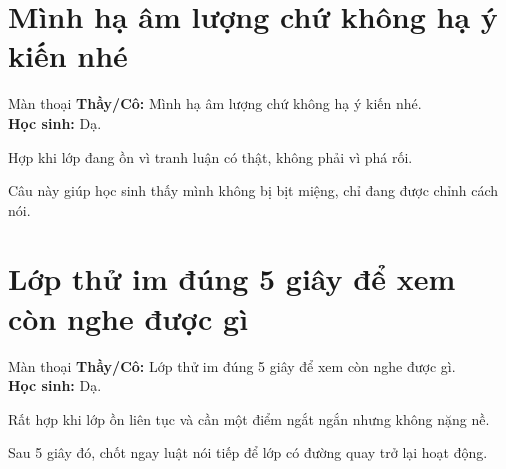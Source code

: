 \section{Mình hạ âm lượng chứ không hạ ý kiến nhé}
\begin{manthoai}{Màn thoại}
\textbf{Thầy/Cô:} Mình hạ âm lượng chứ không hạ ý kiến nhé.\\
\textbf{Học sinh:} Dạ.
\end{manthoai}
\begin{dungkhinào}
Hợp khi lớp đang ồn vì tranh luận có thật, không phải vì phá rối.
\end{dungkhinào}
\begin{nhipthem}
Câu này giúp học sinh thấy mình không bị bịt miệng, chỉ đang được chỉnh cách nói.
\end{nhipthem}
\ngancach

\section{Lớp thử im đúng 5 giây để xem còn nghe được gì}
\begin{manthoai}{Màn thoại}
\textbf{Thầy/Cô:} Lớp thử im đúng 5 giây để xem còn nghe được gì.\\
\textbf{Học sinh:} Dạ.
\end{manthoai}
\begin{dungkhinào}
Rất hợp khi lớp ồn liên tục và cần một điểm ngắt ngắn nhưng không nặng nề.
\end{dungkhinào}
\begin{nhipthem}
Sau 5 giây đó, chốt ngay luật nói tiếp để lớp có đường quay trở lại hoạt động.
\end{nhipthem}

